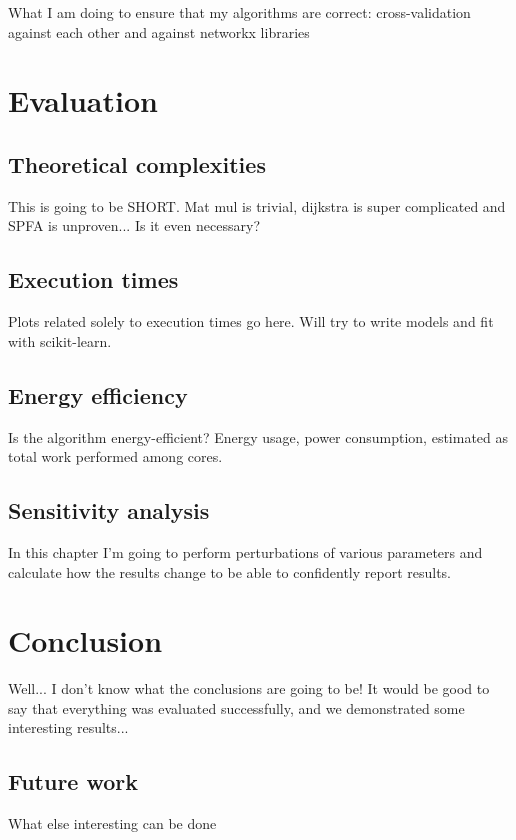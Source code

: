 \documentclass[12pt,a4paper,twoside,openright]{report}
\begin{document}
What I am doing to ensure that my algorithms are correct: cross-validation against each other and against networkx libraries

\chapter{Evaluation}
\section{Theoretical complexities}
This is going to be SHORT. Mat mul is trivial, dijkstra is super complicated and SPFA is unproven... Is it even necessary? 

\section{Execution times}
Plots related solely to execution times go here. Will try to write models and fit with scikit-learn.

\section{Energy efficiency}
Is the algorithm energy-efficient? Energy usage, power consumption, estimated as total work performed among cores.

\section{Sensitivity analysis}
In this chapter I'm going to perform perturbations of various parameters and calculate how the results change to be able to confidently report results.

\chapter{Conclusion}

Well... I don't know what the conclusions are going to be! It would be good to say that everything was evaluated successfully, and we demonstrated some interesting results... 

\section{Future work}
What else interesting can be done
\end{document}
